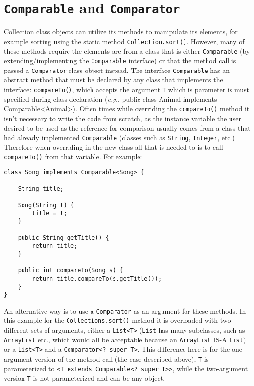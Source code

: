 \documentclass{tufte-handout}
\begin{document}
    \section*{\texttt{Comparable} and \texttt{Comparator}}
    Collection class objects can utilize its methods to manipulate its elements, for example sorting using the static method \texttt{Collection.sort()}. However, many of these methods require the elements are from a class that is either \texttt{Comparable} (by extending/implementing the \texttt{Comparable} interface) or that the method call is passed a \texttt{Comparator} class object instead. The interface \texttt{Comparable} has an abstract method that must be declared by any class that implements the interface: \texttt{compareTo()}, which accepts the argument \texttt{T} which is parameter is must specified during class declaration (\textit{e.g.}, public class Animal implements Comparable<Animal>). Often times while overriding the \texttt{compareTo()} method it isn't necessary to write the code from scratch, as the instance variable the user desired to be used as the reference for comparison usually comes from a class that had already implemented \texttt{Comparable} (classes such as \texttt{String}, \texttt{Integer}, etc.) Therefore when overriding in the new class all that is needed to is to call \texttt{compareTo()} from that variable. For example:

    \begin{lstlisting}
class Song implements Comparable<Song> {
    
    String title;

    Song(String t) {
        title = t;
    }

    public String getTitle() {
        return title;
    }

    public int compareTo(Song s) {
        return title.compareTo(s.getTitle());
    }
}
    \end{lstlisting}

    An alternative way is to use a \texttt{Comparator} as an argument for these methods. In this example for the \texttt{Collections.sort()} method it is overloaded with two different sets of arguments, either a \texttt{List<T>} (\texttt{List} has many subclasses, such as \texttt{ArrayList} etc., which would all be acceptable because an \texttt{ArrayList} IS-A \texttt{List}) or a \texttt{List<T>} and a \texttt{Comparator<? super T>}. This difference here is for the one-argument version of the method call (the case described above), \texttt{T} is parameterized to \texttt{<T extends Comparable<? super T>>}, while the two-argument version \texttt{T} is not parameterized and can be any object.
\end{document}
